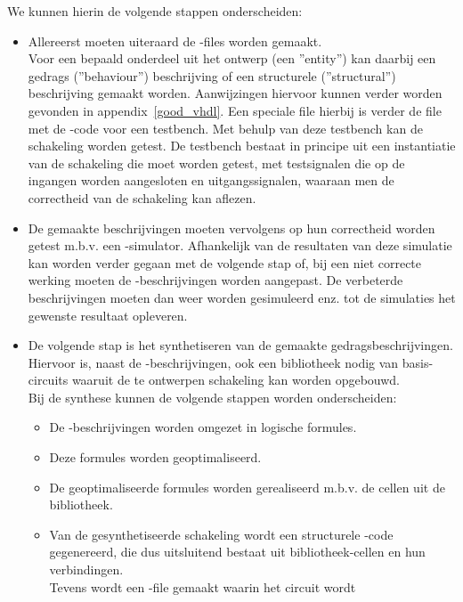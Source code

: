 We kunnen hierin de volgende stappen onderscheiden:
\begin{itemize}
\item Allereerst moeten uiteraard de -files worden gemaakt.
      \\
      Voor een bepaald onderdeel uit het ontwerp (een ''entity'') kan
      daarbij een gedrags (''behaviour'') beschrijving of een 
      structurele (''structural'') beschrijving gemaakt worden. 
      Aanwijzingen hiervoor kunnen verder worden gevonden in appendix~\ref{good_vhdl}.
      Een speciale file hierbij is verder de file met de -code voor 
      een testbench. Met behulp van deze testbench kan de schakeling worden
      getest. De testbench bestaat in principe uit een instantiatie van
      de schakeling die moet worden getest, met testsignalen die op de
      ingangen worden aangesloten en uitgangssignalen, waaraan men de
      correctheid van de schakeling kan aflezen.
\item De gemaakte beschrijvingen moeten vervolgens op hun correctheid
      worden getest m.b.v. een -simulator. Afhankelijk van de resultaten
      van deze simulatie kan worden verder gegaan met de volgende stap
      of, bij een niet correcte werking moeten de -beschrijvingen
      worden aangepast. De verbeterde beschrijvingen moeten dan weer worden
      gesimuleerd enz. tot de simulaties het gewenste resultaat opleveren.
\item De volgende stap is het synthetiseren van de gemaakte gedragsbeschrijvingen.
      Hiervoor is, naast de -beschrijvingen, ook een bibliotheek nodig
      van basis-circuits waaruit de te ont\-werpen schakeling kan worden
      opgebouwd.\\
      Bij de synthese kunnen de volgende stappen worden onderscheiden:
      \begin{itemize}
      \item De -beschrijvingen worden omgezet in logische formules.
      \item Deze formules worden geoptimaliseerd.
      \item De geoptimaliseerde formules worden gerealiseerd m.b.v. de
            cellen uit de bibliotheek.
      \item Van de gesynthetiseerde schakeling wordt een structurele
            -code gegenereerd, die dus uitsluitend bestaat uit
            bibliotheek-cellen en hun verbindingen.\\
            Tevens wordt een -file gemaakt waarin het circuit wordt

\end{itemize}
\end{itemize}
